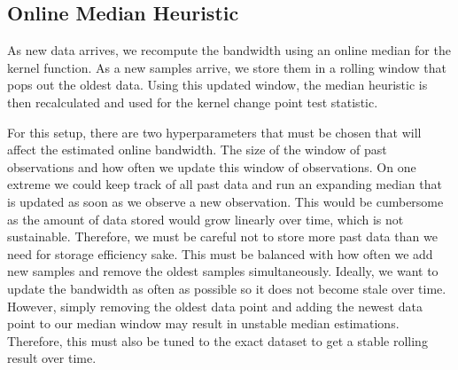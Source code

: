 \subsection{Online Median Heuristic}

As new data arrives, we recompute the bandwidth using an online median for the kernel function. As a new samples arrive, we store them in a rolling window that pops out the oldest data. Using this updated window, the median heuristic is then recalculated and used for the kernel change point test statistic.%

For this setup, there are two hyperparameters that must be chosen that will affect the estimated online bandwidth. The size of the window of past observations and how often we update this window of observations. On one extreme we could keep track of all past data and run an expanding median that is updated as soon as we observe a new observation. This would be cumbersome as the amount of data stored would grow linearly over time, which is not sustainable. Therefore, we must be careful not to store more past data than we need for storage efficiency sake. This must be balanced with how often we add new samples and remove the oldest samples simultaneously. Ideally, we want to update the bandwidth as often as possible so it does not become stale over time. However, simply removing the oldest data point and adding the newest data point to our median window may result in unstable median estimations. Therefore, this must also be tuned to the exact dataset to get a stable rolling result over time.

